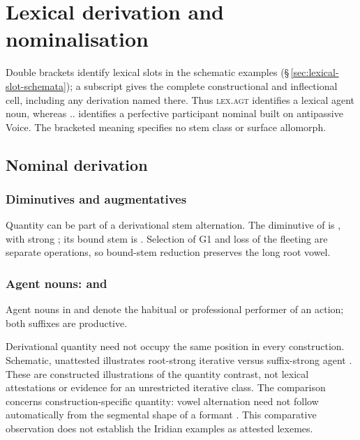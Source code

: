 \chapter{Lexical derivation and nominalisation}\label{ch:derivational}\label{ch:derivation-nominalisation}

Double brackets identify lexical slots in the schematic examples
(§\,\ref{sec:lexical-slot-schemata}); a subscript gives the complete
constructional and inflectional cell, including any derivation named there.
Thus \textsc{lex.agt} identifies a lexical agent noun, whereas
\Antip{}.\Pf{}.\Nmlz{} identifies a perfective participant nominal
built on antipassive Voice. The bracketed meaning specifies no stem class
or surface allomorph.

\section{Nominal derivation}

\subsection{Diminutives and augmentatives}

Quantity can be part of a derivational stem alternation. The diminutive of
 is , with strong ; its bound stem is
. Selection of G1 and loss of the fleeting  are separate
operations, so bound-stem reduction preserves the long root vowel.

\subsection{Agent nouns:  and }\label{sec:lexical-agent-nouns}

Agent nouns in  and  denote the habitual or
professional performer of an action; both suffixes are productive.

Derivational quantity need not occupy the same position in every construction.
Schematic, unattested  illustrates root-strong iterative
 versus suffix-strong agent . These are constructed
illustrations of the quantity contrast, not lexical attestations or evidence
for an unrestricted iterative class.
The comparison concerns construction-specific quantity: vowel alternation
need not follow automatically from the segmental shape of a formant
\cite{akelaitiene1995}. This comparative observation does not establish the
Iridian examples as attested lexemes.

